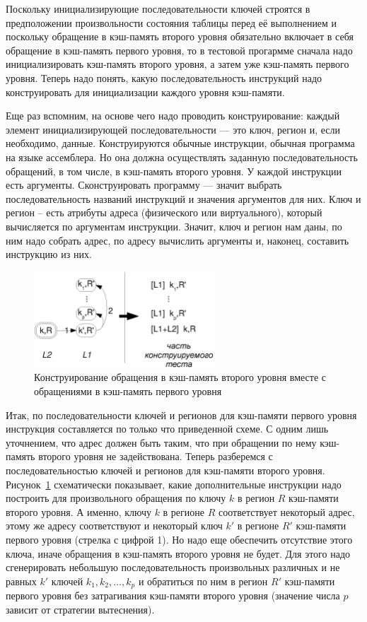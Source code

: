 Поскольку инициализирующие последовательности ключей строятся в предположении
произвольности состояния таблицы перед её выполнением и поскольку обращение в
кэш-память второго уровня обязательно включает в себя обращение в кэш-память
первого уровня, то в тестовой прогармме сначала надо инициализировать кэш-память
второго уровня, а затем уже кэш-память первого уровня. Теперь надо понять, какую
последовательность инструкций надо конструировать для инициализации каждого
уровня кэш-памяти.

Еще раз вспомним, на основе чего надо проводить конструирование: каждый элемент
инициализирующей последовательности --- это ключ, регион и, если необходимо, данные.
Конструируются обычные инструкции, обычная программа на языке ассемблера. Но она
должна осуществлять заданную последовательность обращений, в том числе, в
кэш-память второго уровня. У каждой инструкции есть аргументы. Сконструировать
программу --- значит выбрать последовательность названий инструкций и значения
аргументов для них. Ключ и регион -- есть атрибуты адреса (физического или
виртуального), который вычисляется по аргументам инструкции. Значит, ключ и
регион нам даны, по ним надо собрать адрес, по адресу вычислить аргументы и,
наконец, составить инструкцию из них.

\begin{figure}[h] \centering
\includegraphics[width=0.6\textwidth]{2.theor/L1L2}
\caption{Конструирование обращения в кэш-память второго уровня вместе с
обращениями в кэш-память первого уровня}\label{fig:L1L2}
\end{figure}

Итак, по последовательности ключей и регионов для кэш-памяти первого уровня
инструкция составляется по только что приведенной схеме. С одним лишь
уточнением, что адрес должен быть таким, что при обращении по нему кэш-память
второго уровня не задействована. Теперь разберемся с последовательностью ключей
и регионов для кэш-памяти второго уровня. Рисунок~\ref{fig:L1L2} схематически
показывает, какие дополнительные инструкции надо построить для произвольного
обращения по ключу $k$ в регион $R$ кэш-памяти второго уровня. А именно, ключу
$k$ в регионе $R$ соответствует некоторый адрес, этому же адресу соответствуют и
некоторый ключ $k'$ в регионе $R'$ кэш-памяти первого уровня (стрелка с цифрой
1). Но надо еще обеспечить отсутствие этого ключа, иначе обращения в кэш-память
второго уровня не будет. Для этого надо сгенерировать небольшую
последовательность произвольных различных и не равных $k'$ ключей $k_1, k_2,
\dots, k_p$ и обратиться по ним в регион $R'$ кэш-памяти первого уровня без
затрагивания кэш-памяти второго уровня (значение числа $p$ зависит от стратегии
вытеснения).

